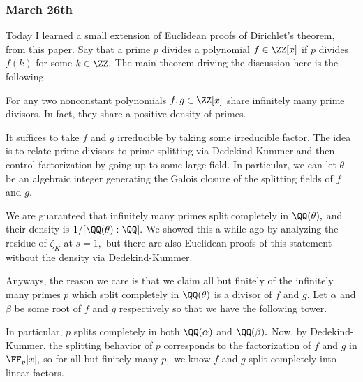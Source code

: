 \subsubsection{March 26th}
Today I learned a small extension of Euclidean proofs of Dirichlet's theorem, from \href{https://projecteuclid.org/euclid.facm/1229442627}{this paper}. Say that a prime $p$ divides a polynomial $f\in\ZZ[x]$ if $p$ divides $f(k)$ for some $k\in\ZZ.$ The main theorem driving the discussion here is the following.
\begin{theorem}
    For any two nonconstant polynomials $f,g\in\ZZ[x]$ share infinitely many prime divisors. In fact, they share a positive density of primes.
\end{theorem}
It suffices to take $f$ and $g$ irreducible by taking some irreducible factor. The idea is to relate prime divisors to prime-splitting via Dedekind-Kummer and then control factorization by going up to some large field. In particular, we can let $\theta$ be an algebraic integer generating the Galois closure of the splitting fields of $f$ and $g.$

We are guaranteed that infinitely many primes split completely in $\QQ(\theta),$ and their density is $1/[\QQ(\theta):\QQ].$ We showed this a while ago by analyzing the residue of $\zeta_K$ at $s=1,$ but there are also Euclidean proofs of this statement without the density via Dedekind-Kummer.

Anyways, the reason we care is that we claim all but finitely of the infinitely many primes $p$ which split completely in $\QQ(\theta)$ is a divisor of $f$ and $g.$ Let $\alpha$ and $\beta$ be some root of $f$ and $g$ respectively so that we have the following tower.
\begin{center}
\end{center}
In particular, $p$ splits completely in both $\QQ(\alpha)$ and $\QQ(\beta).$ Now, by Dedekind-Kummer, the splitting behavior of $p$ corresponds to the factorization of $f$ and $g$ in $\FF_p[x],$ so for all but finitely many $p,$ we know $f$ and $g$ split completely into linear factors.

